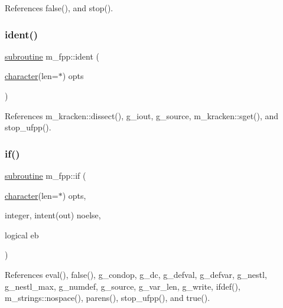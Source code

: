 References false(), and stop().

\mbox{\label{namespacem__fpp_afe91155aa0c891fc35f3927e777440ea}} 
\subsubsection{\texorpdfstring{ident()}{ident()}}
{\footnotesize\ttfamily \hyperlink{M__stopwatch_83_8txt_acfbcff50169d691ff02d4a123ed70482}{subroutine} m\+\_\+fpp\+::ident (\begin{DoxyParamCaption}\item[{\hyperlink{option__stopwatch_83_8txt_abd4b21fbbd175834027b5224bfe97e66}{character}(len=$\ast$)}]{opts }\end{DoxyParamCaption})}



References m\+\_\+kracken\+::dissect(), g\+\_\+iout, g\+\_\+source, m\+\_\+kracken\+::sget(), and stop\+\_\+ufpp().

\mbox{\label{namespacem__fpp_a4866adfbe17fb5cc245f2ad058bb47f2}} 
\subsubsection{\texorpdfstring{if()}{if()}}
{\footnotesize\ttfamily \hyperlink{M__stopwatch_83_8txt_acfbcff50169d691ff02d4a123ed70482}{subroutine} m\+\_\+fpp\+::if (\begin{DoxyParamCaption}\item[{\hyperlink{option__stopwatch_83_8txt_abd4b21fbbd175834027b5224bfe97e66}{character}(len=$\ast$)}]{opts,  }\item[{integer, intent(out)}]{noelse,  }\item[{logical}]{eb }\end{DoxyParamCaption})}



References eval(), false(), g\+\_\+condop, g\+\_\+dc, g\+\_\+defval, g\+\_\+defvar, g\+\_\+nestl, g\+\_\+nestl\+\_\+max, g\+\_\+numdef, g\+\_\+source, g\+\_\+var\+\_\+len, g\+\_\+write, ifdef(), m\+\_\+strings\+::nospace(), parens(), stop\+\_\+ufpp(), and true().

\mbox{\label{namespacem__fpp_acc125ade915dbf457a06801f2e241306}} 
